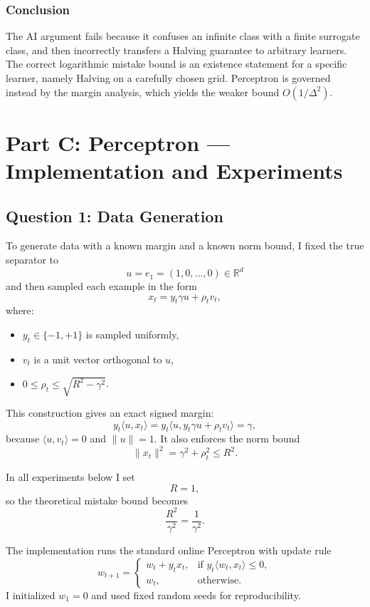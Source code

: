 \documentclass{article}
\begin{document}
\subsubsection{Conclusion}

The AI argument fails because it confuses an infinite class with a finite surrogate class, and then
incorrectly transfers a Halving guarantee to arbitrary learners. The correct logarithmic mistake
bound is an existence statement for a specific learner, namely Halving on a carefully chosen grid.
Perceptron is governed instead by the margin analysis, which yields the weaker bound
$O(1/\Delta^2)$.

\newpage
\section{Part C: Perceptron --- Implementation and Experiments}

\subsection{Question 1: Data Generation}

To generate data with a known margin and a known norm bound, I fixed the true separator to
$$
u = e_1 = (1,0,\dots,0) \in \mathbb{R}^d
$$
and then sampled each example in the form
$$
x_t = y_t \gamma u + \rho_t v_t,
$$
where:
\begin{itemize}
\item $y_t \in \{-1,+1\}$ is sampled uniformly,
\item $v_t$ is a unit vector orthogonal to $u$,
\item $0 \leq \rho_t \leq \sqrt{R^2-\gamma^2}$.
\end{itemize}

This construction gives an exact signed margin:
$$
y_t \langle u, x_t \rangle
= y_t \langle u, y_t \gamma u + \rho_t v_t \rangle
= \gamma,
$$
because $\langle u, v_t \rangle = 0$ and $\|u\|=1$. It also enforces the norm bound
$$
\|x_t\|^2 = \gamma^2 + \rho_t^2 \leq R^2.
$$

In all experiments below I set
$$
R=1,
$$
so the theoretical mistake bound becomes
$$
\frac{R^2}{\gamma^2} = \frac{1}{\gamma^2}.
$$

The implementation runs the standard online Perceptron with update rule
$$
w_{t+1} =
\begin{cases}
w_t + y_t x_t, & \text{if } y_t \langle w_t, x_t \rangle \leq 0, \\
w_t, & \text{otherwise.}
\end{cases}
$$
I initialized $w_1=0$ and used fixed random seeds for reproducibility.
\end{document}
